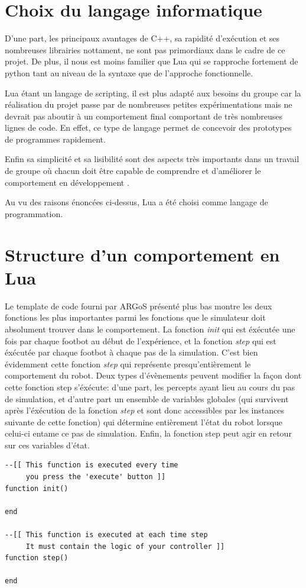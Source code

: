 \section{Choix du langage informatique}

D'une part, les principaux avantages de C++, sa rapidité d'exécution et ses nombreuses librairies nottament, ne sont pas primordiaux dans le cadre de ce projet. De plus, il nous est moins familier que Lua qui se rapproche fortement de python tant au niveau de la syntaxe que de l'approche fonctionnelle.

Lua étant un langage de scripting, il est plus adapté aux besoins du groupe car la réalisation du projet passe par de nombreuses petites expérimentations mais ne devrait pas aboutir à un comportement final comportant de très nombreuses lignes de code. En effet, ce type de langage permet de concevoir des prototypes de programmes rapidement.

Enfin sa simplicité et sa lisibilité sont des aspects très importants dans un travail de groupe où chacun doit être capable de comprendre et d'améliorer le comportement en développement \cite{compC++,compLua}.

Au vu des raisons énoncées ci-dessus, Lua a été choisi comme langage de programmation.

\section{Structure d'un comportement en Lua}

Le template de code fourni par ARGoS présenté plus bas montre les deux fonctions les plus importantes parmi les fonctions que le simulateur doit absolument trouver dans le comportement. La fonction \emph{init} qui est éxécutée une fois par chaque footbot au début de l'expérience, et la fonction \emph{step} qui est éxécutée par chaque footbot à chaque pas de la simulation. C'est bien évidemment cette fonction \emph{step} qui représente presqu'entièrement le comportement du robot. Deux types d'évènements peuvent modifier la façon dont cette fonction step s'éxécute: d'une part, les percepts ayant lieu au cours du pas de simulation, et d'autre part un ensemble de variables globales (qui survivent après l'éxécution de la fonction \emph{step} et sont donc accessibles par les instances suivante de cette fonction) qui détermine entièrement l'état du robot lorsque celui-ci entame ce pas de simulation. Enfin, la fonction step peut agir en retour sur ces variables d'état.~\cite{argosSite1}
\begin{lstlisting}[caption=Structure de base d'un comportement en Lua]
--[[ This function is executed every time
     you press the 'execute' button ]]
function init()

end

--[[ This function is executed at each time step
     It must contain the logic of your controller ]]
function step()

end
\end{lstlisting}

